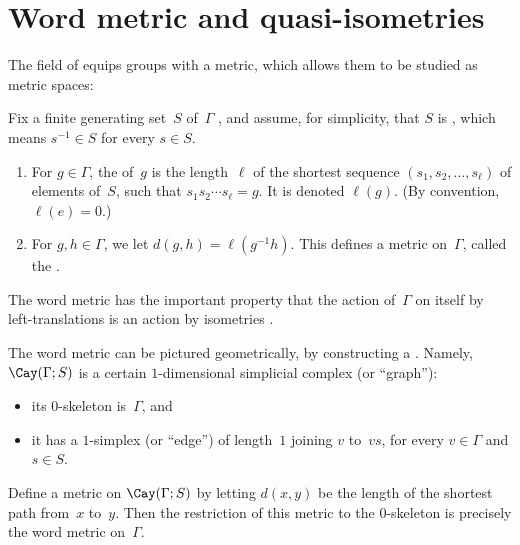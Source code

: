 
\label{QuasiChap}



\section{Word metric and quasi-isometries} \label{WordMetricSect}

The field of  equips groups with a metric, which allows them to be studied as metric spaces:

\begin{defn} \label{WordMetricDefn}
Fix a finite generating set~$S$ of~$\Gamma$ , and assume, for simplicity, that $S$ is , which means $s^{-1} \in S$ for every $s \in S$.
\noprelistbreak 
	\begin{enumerate}
	\item For $g \in \Gamma$, the  of~$g$ is the length~$\ell$ of the shortest sequence $(s_1,s_2,\ldots,s_\ell)$ of elements of~$S$, such that $s_1s_2\cdots s_\ell = g$. It is denoted $\ell(g)$.
	(By convention, $\ell(e) = 0$.)
	\item For $g,h \in \Gamma$, we let $d(g,h) = \ell(g^{-1} h)$. This defines a metric on~$\Gamma$, called the  .
	\end{enumerate}
\end{defn}

The word metric has the important property that the action of~$\Gamma$ on itself by left-translations is an action by isometries .

\begin{rem}
The word metric can be pictured geometrically, by constructing a . Namely, $\Cay(\Gamma; S)$ is a certain $1$-dimensional simplicial complex (or ``graph''):
	\begin{itemize} 
	\item its $0$-skeleton is~$\Gamma$,
	and
	\item it has a $1$-simplex (or ``edge'') of length~$1$ joining $v$ to~$vs$, for every $v \in \Gamma$ and $s \in S$.
	\end{itemize}
Define a metric on $\Cay(\Gamma; S)$ by letting $d(x,y)$ be the length of the shortest path from~$x$ to~$y$. Then the restriction of this metric to the $0$-skeleton is precisely the word metric on~$\Gamma$.
\end{rem}


